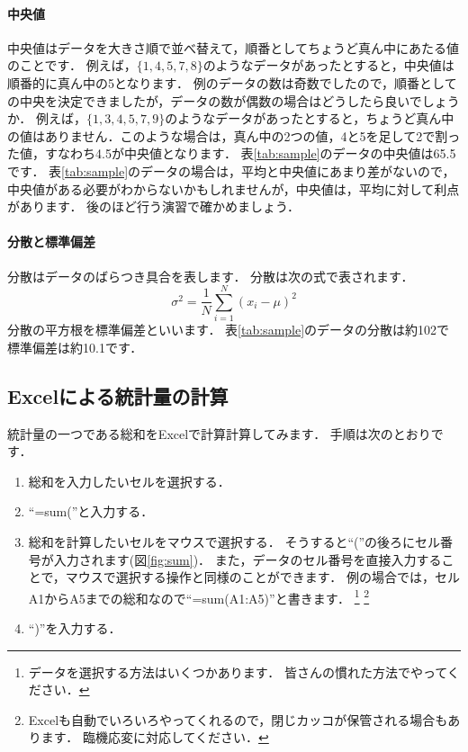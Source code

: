 \paragraph{中央値}
中央値はデータを大きさ順で並べ替えて，順番としてちょうど真ん中にあたる値のことです．
例えば，$\{1, 4, 5, 7, 8\}$のようなデータがあったとすると，中央値は順番的に真ん中の5となります．
例のデータの数は奇数でしたので，順番としての中央を決定できましたが，データの数が偶数の場合はどうしたら良いでしょうか．
例えば，$\{1,3,4,5,7,9\}$のようなデータがあったとすると，ちょうど真ん中の値はありません．このような場合は，真ん中の2つの値，4と5を足して2で割った値，すなわち4.5が中央値となります．
表\ref{tab:sample}のデータの中央値は65.5です．
表\ref{tab:sample}のデータの場合は，平均と中央値にあまり差がないので，中央値がある必要がわからないかもしれませんが，中央値は，平均に対して利点があります．
後のほど行う演習で確かめましょう．

\paragraph{分散と標準偏差}
分散はデータのばらつき具合を表します．
分散は次の式で表されます．
\begin{equation}
    \sigma^2 = \frac{1}{N} \sum_{i=1}^{N} (x_i - \mu)^2
\end{equation}
分散の平方根を標準偏差といいます．
表\ref{tab:sample}のデータの分散は約102で標準偏差は約10.1です．


\subsection{Excelによる統計量の計算}

統計量の一つである総和をExcelで計算計算してみます．
手順は次のとおりです．

\begin{enumerate}
    \item 総和を入力したいセルを選択する．
    \item ``=sum(''と入力する．
    \item 総和を計算したいセルをマウスで選択する．
    そうすると``(''の後ろにセル番号が入力されます(図\ref{fig:sum})．
    また，データのセル番号を直接入力することで，マウスで選択する操作と同様のことができます．
    例の場合では，セルA1からA5までの総和なので``=sum(A1:A5)''と書きます．
    \footnote{データを選択する方法はいくつかあります．
      皆さんの慣れた方法でやってください．}
    \footnote{Excelも自動でいろいろやってくれるので，閉じカッコが保管される場合もあります．
      臨機応変に対応してください．}
    \item ``)''を入力する．
\end{enumerate}

